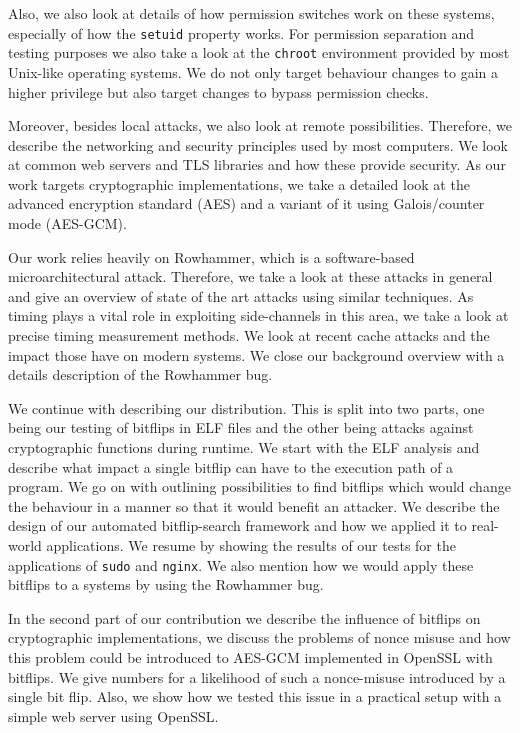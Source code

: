 Also, we also look at details of how permission switches work on these systems,
especially of how the \texttt{setuid} property works. For permission separation
and testing purposes we also take a look at the \texttt{chroot}
environment provided by most Unix-like operating systems. We do not only target
behaviour changes to gain a higher privilege but also target changes to bypass
permission checks.

Moreover, besides local attacks, we also look at remote possibilities.
Therefore, we describe the networking and security principles used by most
computers. We look at common web servers and TLS libraries and how these
provide security. As our work targets cryptographic implementations, we take a
detailed look at the advanced encryption standard (AES) and a variant of it
using Galois/counter mode (AES-GCM).

Our work relies heavily on Rowhammer, which is a software-based
microarchitectural attack. Therefore, we take a look at these attacks in general
and give an overview of state of the art attacks using similar techniques. As
timing plays a vital role in exploiting side-channels in this area, we take a
look at precise timing measurement methods. We look at recent cache attacks and
the impact those have on modern systems. We close our background overview with a
details description of the Rowhammer bug.

We continue with describing our distribution. This is split into two parts, one
being our testing of bitflips in ELF files and the other being attacks against
cryptographic functions during runtime. We start with the ELF analysis and
describe what impact a single bitflip can have to the execution path of a
program. We go on with outlining possibilities to find bitflips which would
change the behaviour in a manner so that it would benefit an attacker. We
describe the design of our automated bitflip-search framework and how we applied
it to real-world applications. We resume by showing the results of our tests for
the applications of \texttt{sudo} and \texttt{nginx}. We also mention how we
would apply these bitflips to a systems by using the Rowhammer bug.

In the second part of our contribution we describe the influence of bitflips on
cryptographic implementations, we discuss the problems of nonce misuse and how
this problem could be introduced to AES-GCM implemented in OpenSSL with
bitflips. We give numbers for a likelihood of such a nonce-misuse introduced by
a single bit flip. Also, we show how we tested this issue in a practical setup
with a simple web server using OpenSSL.

